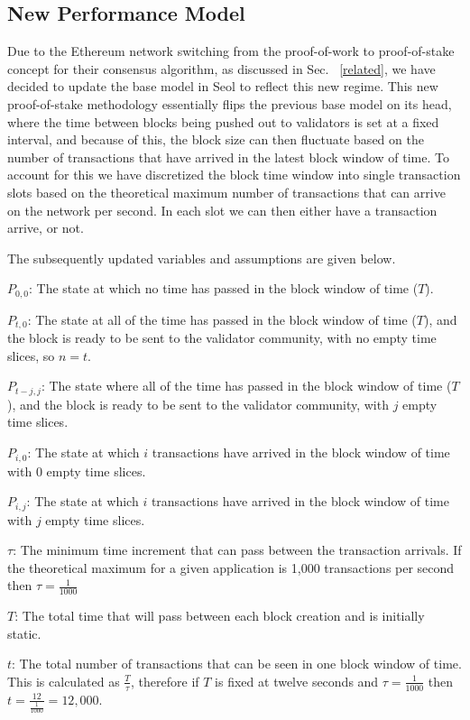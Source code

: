 \documentclass[conference]{IEEEtran}
\begin{document}
\subsection{New Performance Model}\label{new_model}

Due to the Ethereum network switching from the proof-of-work to proof-of-stake 
concept for their consensus algorithm, as discussed in Sec. ~\ref{related}, we have 
decided to update the base model in Seol\cite{2020_ACM_Seol} to reflect this new 
regime. This new proof-of-stake methodology essentially flips the previous base 
model on its head, where the time between blocks being pushed out to validators is 
set at a fixed interval, and because of this, the block size can then fluctuate based 
on the number of transactions that have arrived in the latest block window of time. 
To account for this we have discretized the block time window into single transaction
slots based on the theoretical maximum number of transactions that can arrive on 
the network per second. In each slot we can then either have a transaction arrive, 
or not. 

The subsequently updated variables and assumptions are given below. 

$P_{0,0}$: The state at which no time has passed in the block window of time ($T$). 

$P_{t,0}$: The state at all of the time has passed in the block window of time ($T$), and
the block is ready to be sent to the validator community, with no empty time slices, so 
$n = t$. 

$P_{t-j,j}$: The state where all of the time has passed in the block window of time ($T$), and
the block is ready to be sent to the validator community, with $j$ empty time slices. 

$P_{i,0}$: The state at which $i$ transactions have arrived in the 
block window of time with 0 empty time slices. 

$P_{i,j}$: The state at which $i$ transactions have arrived in the 
block window of time with $j$ empty time slices. 

$\tau$: The minimum time increment that can pass between the 
transaction arrivals. If the theoretical maximum for a given application is 1,000 transactions 
per second then $\tau = \frac{1}{1000}$

$T$: The total time that will pass between each block creation and is initially static.

$t$: The total number of transactions that can be seen in one block window of time.
This is calculated as $\frac{T}{\tau}$, therefore if $T$ is fixed at twelve seconds and
$\tau=\frac{1}{1000}$ then $t=\frac{12}{\frac{1}{1000}}=12,000$. 
\end{document}

